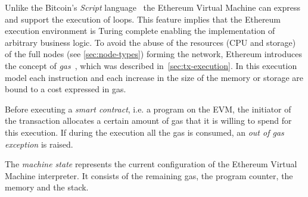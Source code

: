 Unlike the Bitcoin's \emph{Script} language~\cite{bib:masteringbitcoin} the
Ethereum Virtual Machine can express and support the execution of loops. This
feature implies that the Ethereum execution environment is Turing complete
enabling the implementation of arbitrary business logic. To avoid the abuse of
the resources (CPU and storage) of the full nodes (see \autoref{sec:node-types})
forming the network, Ethereum introduces the concept of
\emph{gas}~\cite{wood2018ethereum}, which was described
in~\autoref{sec:tx-execution}. In this execution model each instruction and each
increase in the size of the memory or storage are bound to a cost expressed in
gas.


Before executing a \emph{smart contract}, i.e. a program on the EVM, the
initiator of the transaction allocates a certain amount of gas that it is
willing to spend for this execution. If during the execution all the gas is
consumed, an \emph{out of gas exception} is raised.


The \emph{machine state} represents the current configuration of the Ethereum
Virtual Machine interpreter. It consists of the remaining gas, the program
counter, the memory and the stack.


